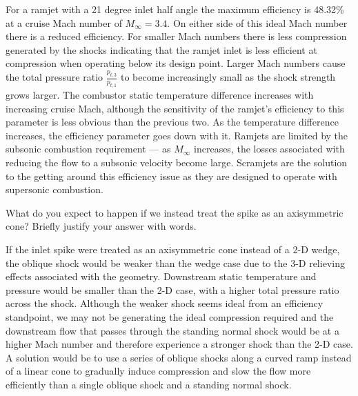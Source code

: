 \documentclass[../main.tex]{subfiles}
\begin{document}
\discussion{}
For a ramjet with a 21 degree inlet half angle the maximum efficiency is 48.32\% at a cruise Mach number of \(M_\infty=3.4\).
On either side of this ideal Mach number there is a reduced efficiency.
For smaller Mach numbers there is less compression generated by the shocks indicating that the ramjet inlet is less efficient at compression when operating below its design point. 
Larger Mach numbers cause the total pressure ratio \(\frac{p_{t,3}}{p_{t,1}}\) to become increasingly small as the shock strength grows larger.
The combustor static temperature difference increases with increasing cruise Mach, although the sensitivity of the ramjet's efficiency to this parameter is less obvious than the previous two.
As the temperature difference increases, the efficiency parameter goes down with it.
Ramjets are limited by the subsonic combustion requirement --- as \(M_\infty\) increases, the losses associated with reducing the flow to a subsonic velocity become large.
Scramjets are the solution to the getting around this efficiency issue as they are designed to operate with supersonic combustion.



What do you expect to happen if we instead treat the spike as an axisymmetric cone?
Briefly justify your answer with words.

\discussion{}
If the inlet spike were treated as an axisymmetric cone instead of a 2-D wedge, the oblique shock would be weaker than the wedge case due to the 3-D relieving effects associated with the geometry.
Downstream static temperature and pressure would be smaller than the 2-D case, with a higher total pressure ratio across the shock. 
Although the weaker shock seems ideal from an efficiency standpoint, we may not be generating the ideal compression required and the downstream flow that passes through the standing normal shock would be at a higher Mach number and therefore experience a stronger shock than the 2-D case.
A solution would be to use a series of oblique shocks along a curved ramp instead of a linear cone to gradually induce compression and slow the flow more efficiently than a single oblique shock and a standing normal shock.
\end{document}
